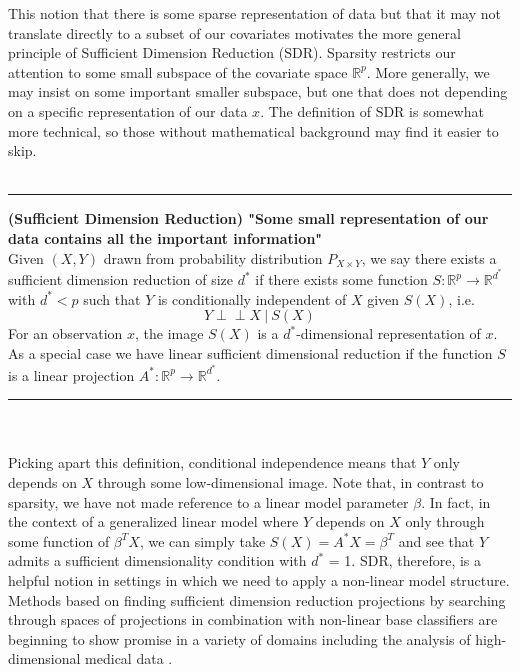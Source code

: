 \documentclass[thesis.tex]{subfiles}
\begin{document}
This notion that there is some sparse representation of data but that it may not translate directly to a subset of our covariates motivates the more general principle of Sufficient Dimension Reduction (SDR). Sparsity restricts our attention to some small subspace of the covariate space $\mathbb{R}^p$. More generally, we may insist on some important smaller subspace, but one that does not depending on a specific representation of our data $x$. The definition of SDR is somewhat more technical, so those without mathematical background may find it easier to skip.\\~\\

\hrule
\begin{definition}{\textbf{(Sufficient Dimension Reduction) "Some small representation of our data contains all the important information"}} \\
Given $(X,Y)$ drawn from probability distribution $P_{X\times Y}$, we say there exists a sufficient dimension reduction of size $d^*$ if there exists some function $S: \mathbb{R}^p \rightarrow \mathbb{R}^{d^*}$  with $d^* < p$ such that $Y$ is conditionally independent of $X$ given $S(X)$, i.e.
$$ Y \perp\!\!\!\perp X \ | \ S(X) $$
For an observation $x$, the image $S(X)$ is a $d^*$-dimensional representation of $x$. As a special case we have linear sufficient dimensional reduction if the function $S$ is a linear projection $A^*:\mathbb{R}^p\rightarrow \mathbb{R}^{d^*}$.
\end{definition}
\hrule
~\\~\\
Picking apart this definition, conditional independence means that $Y$ only depends on $X$ through some low-dimensional image. Note that, in contrast to sparsity, we have not made reference to a linear model parameter $\beta$. In fact, in the context of a generalized linear model where $Y$ depends on $X$ only through some function of $\beta^TX$, we can simply take $S(X) = A^*X = \beta^T$ and see that $Y$ admits a sufficient dimensionality condition with $d^*$ = 1. SDR, therefore, is a helpful notion in settings in which we need to apply a non-linear model structure. Methods based on finding sufficient dimension reduction projections by searching through spaces of projections \citep{omidiran_high-dimensional_2010} in combination with non-linear base classifiers are beginning to show promise in a variety of domains  including the analysis of high-dimensional medical data \citep{cannings_random-projection_2017}.
\end{document}
